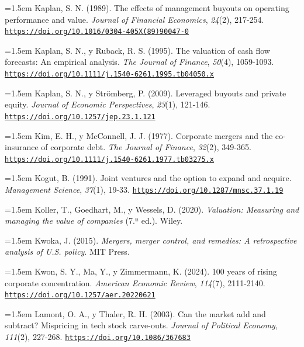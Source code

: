 \documentclass[10pt,a4paper]{article}
\begin{document}
\noindent\hangindent=1.5em Kaplan, S. N. (1989). The effects of management buyouts on operating performance and value. \textit{Journal of Financial Economics}, \textit{24}(2), 217-254. \href{https://doi.org/10.1016/0304-405X(89)90047-0}{\nolinkurl{https://doi.org/10.1016/0304-405X(89)90047-0}}

\noindent\hangindent=1.5em Kaplan, S. N., y Ruback, R. S. (1995). The valuation of cash flow forecasts: An empirical analysis. \textit{The Journal of Finance}, \textit{50}(4), 1059-1093. \href{https://doi.org/10.1111/j.1540-6261.1995.tb04050.x}{\nolinkurl{https://doi.org/10.1111/j.1540-6261.1995.tb04050.x}}

\noindent\hangindent=1.5em Kaplan, S. N., y Strömberg, P. (2009). Leveraged buyouts and private equity. \textit{Journal of Economic Perspectives}, \textit{23}(1), 121-146. \href{https://doi.org/10.1257/jep.23.1.121}{\nolinkurl{https://doi.org/10.1257/jep.23.1.121}}

\noindent\hangindent=1.5em Kim, E. H., y McConnell, J. J. (1977). Corporate mergers and the co-insurance of corporate debt. \textit{The Journal of Finance}, \textit{32}(2), 349-365. \href{https://doi.org/10.1111/j.1540-6261.1977.tb03275.x}{\nolinkurl{https://doi.org/10.1111/j.1540-6261.1977.tb03275.x}}

\noindent\hangindent=1.5em Kogut, B. (1991). Joint ventures and the option to expand and acquire. \textit{Management Science}, \textit{37}(1), 19-33. \href{https://doi.org/10.1287/mnsc.37.1.19}{\nolinkurl{https://doi.org/10.1287/mnsc.37.1.19}}

\noindent\hangindent=1.5em Koller, T., Goedhart, M., y Wessels, D. (2020). \textit{Valuation: Measuring and managing the value of companies} (7.ª ed.). Wiley.

\noindent\hangindent=1.5em Kwoka, J. (2015). \textit{Mergers, merger control, and remedies: A retrospective analysis of U.S. policy}. MIT Press.

\noindent\hangindent=1.5em Kwon, S. Y., Ma, Y., y Zimmermann, K. (2024). 100 years of rising corporate concentration. \textit{American Economic Review}, \textit{114}(7), 2111-2140. \href{https://doi.org/10.1257/aer.20220621}{\nolinkurl{https://doi.org/10.1257/aer.20220621}}

\noindent\hangindent=1.5em Lamont, O. A., y Thaler, R. H. (2003). Can the market add and subtract? Mispricing in tech stock carve-outs. \textit{Journal of Political Economy}, \textit{111}(2), 227-268. \href{https://doi.org/10.1086/367683}{\nolinkurl{https://doi.org/10.1086/367683}}
\end{document}
